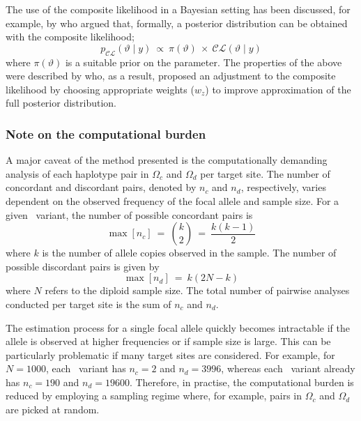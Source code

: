 The use of the composite likelihood in a Bayesian setting has been discussed, for example, by \citet{pauli2011bayesian} who argued that, formally, a posterior distribution can be obtained with the composite likelihood; \ie
\begin{equation}
	p_{\mathcal{C\!L}}(\vartheta\mid y)~\propto~\pi(\vartheta)~\times~\mathcal{C\!L}(\vartheta\mid y)
\end{equation}
where ${\pi(\vartheta)}$ is a suitable prior on the parameter.
The properties of the above were described by \citet{pauli2011bayesian} who, as a result, proposed an adjustment to the composite likelihood by choosing appropriate weights ($w_z$) to improve approximation of the full posterior distribution.




%
\subsubsection{Note on the computational burden}
%

A major caveat of the method presented is the computationally demanding analysis of each haplotype pair in $\Omega_c$ and $\Omega_d$ per target site.
The number of concordant and discordant pairs, denoted by $n_c$ and $n_d$, respectively, varies dependent on the observed frequency of the focal allele and sample size.
For a given \fk{}~variant, the number of possible concordant pairs is
\begin{equation}\label{eq:age_nc}
	\max[n_c] ~=~ {{k}\choose{2}} ~=~ \frac{k(k-1)}{2}
\end{equation}
where $k$ is the number of allele copies observed in the sample.
The number of possible discordant pairs is given by
\begin{equation}\label{eq:age_nd}
	\max[n_d] ~=~ k(2N-k)
\end{equation}
where $N$ refers to the diploid sample size.
The total number of pairwise analyses conducted per target site is the sum of $n_c$ and $n_d$.

The estimation process for a single focal allele quickly becomes intractable if the allele is observed at higher frequencies or if sample size is large.
This can be particularly problematic if many target sites are considered.
For example, for ${N=\num{1000}}$, each ~variant has ${n_c=2}$ and ${n_d=\num{3996}}$, whereas each ~variant already has ${n_c=\num{190}}$ and ${n_d=\num{19600}}$.
Therefore, in practise, the computational burden is reduced by employing a sampling regime where, for example, pairs in $\Omega_c$ and $\Omega_d$ are picked at random.

